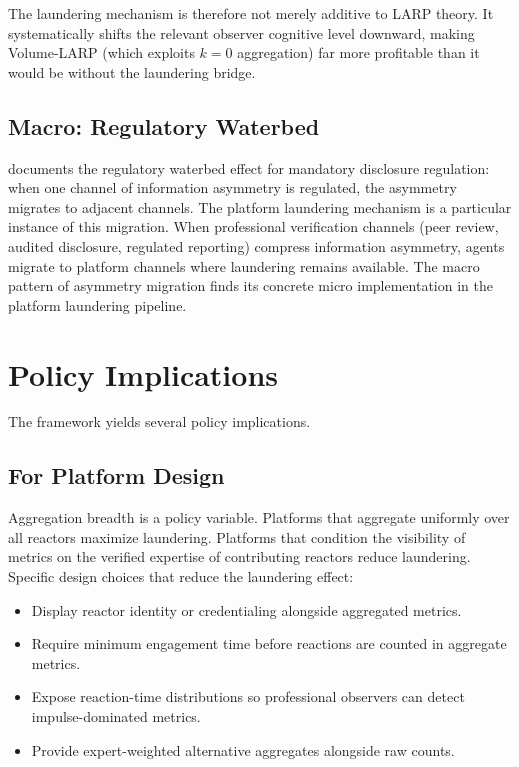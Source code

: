 \documentclass[11pt]{article}
\begin{document}
The laundering mechanism is therefore not merely additive to LARP theory. It systematically shifts the relevant observer cognitive level downward, making Volume-LARP (which exploits $k = 0$ aggregation) far more profitable than it would be without the laundering bridge.

\subsection{Macro: Regulatory Waterbed}

\cite{vosteen2026waterbed} documents the regulatory waterbed effect for mandatory disclosure regulation: when one channel of information asymmetry is regulated, the asymmetry migrates to adjacent channels. The platform laundering mechanism is a particular instance of this migration. When professional verification channels (peer review, audited disclosure, regulated reporting) compress information asymmetry, agents migrate to platform channels where laundering remains available. The macro pattern of asymmetry migration finds its concrete micro implementation in the platform laundering pipeline.

\section{Policy Implications}

The framework yields several policy implications.

\subsection{For Platform Design}

Aggregation breadth is a policy variable. Platforms that aggregate uniformly over all reactors maximize laundering. Platforms that condition the visibility of metrics on the verified expertise of contributing reactors reduce laundering. Specific design choices that reduce the laundering effect:

\begin{itemize}
\item Display reactor identity or credentialing alongside aggregated metrics.
\item Require minimum engagement time before reactions are counted in aggregate metrics.
\item Expose reaction-time distributions so professional observers can detect impulse-dominated metrics.
\item Provide expert-weighted alternative aggregates alongside raw counts.
\end{itemize}
\end{document}

